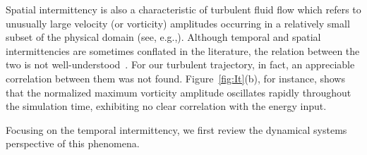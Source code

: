 \documentclass{jfm}
\begin{document}
Spatial intermittency is
also a characteristic of turbulent fluid flow which refers to
unusually large velocity (or vorticity) amplitudes occurring in a relatively small subset of the
physical domain (see, e.g.,).
Although temporal and spatial
intermittencies are sometimes conflated in the literature,
the relation between the two
is not well-understood~\citep{gibbon03}. For our turbulent trajectory, in fact, an appreciable
correlation
between them was not found. Figure~\ref{fig:It}(b), for instance, shows
that the normalized maximum vorticity amplitude oscillates rapidly throughout the simulation
time, exhibiting no clear correlation with the energy input.

Focusing on the temporal intermittency, we first review the dynamical systems
perspective of this phenomena.
\end{document}
